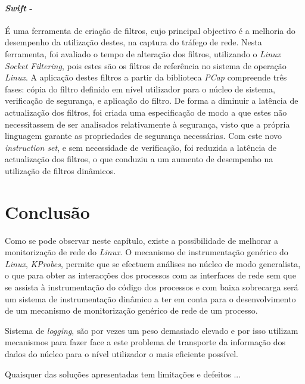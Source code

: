 \paragraph*{\textit{Swift} - }
É uma ferramenta de criação de filtros, cujo principal objectivo é a melhoria do desempenho da utilização destes, na captura do tráfego de rede.
Nesta ferramenta, foi avaliado o tempo de alteração dos filtros, utilizando o \textit{Linux Socket Filtering}, pois estes são os filtros de referência no sistema de operação \textit{Linux}.
A aplicação destes filtros a partir da biblioteca \textit{PCap} compreende três fases: cópia do filtro definido em nível utilizador para o núcleo de sistema, verificação de segurança, e aplicação do filtro.
De forma a diminuir a latência de actualização dos filtros, foi criada uma especificação de modo a que estes não necessitassem de ser analisados relativamente à segurança, visto que a própria linguagem garante as propriedades de segurança necessárias.
Com este novo \textit{instruction set}, e sem necessidade de verificação, foi reduzida a latência de actualização dos filtros, o que conduziu a um aumento de desempenho na utilização de filtros dinâmicos.











\section{Conclusão}
\label{sec:segundo:conclusion}
Como se pode observar neste capítulo, existe a possibilidade de melhorar a monitorização de rede do \textit{Linux}.
O mecanismo de instrumentação genérico do \textit{Linux}, \textit{KProbes}, permite que se efectuem análises no núcleo de modo generalista, o que para obter as interacções dos processos com as interfaces de rede sem que se assista à instrumentação do código dos processos e com baixa sobrecarga será um sistema de instrumentação dinâmico a ter em conta para o desenvolvimento de um mecanismo de monitorização genérico de rede de um processo.

Sistema de \textit{logging}, são por vezes um peso demasiado elevado e por isso utilizam mecanismos para fazer face a este problema de transporte da informação dos dados do núcleo para o nível utilizador o mais eficiente possível.


Quaisquer das soluções apresentadas tem limitações e defeitos ...
